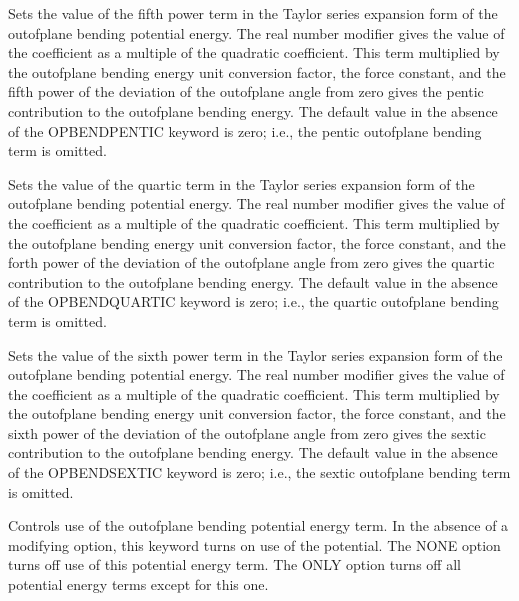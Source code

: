\documentclass[letterpaper,11pt,english]{sphinxmanual}
\begin{document}
  Sets the value of the fifth power term in the Taylor series expansion form of the out\sphinxhyphen{}of\sphinxhyphen{}plane bending potential energy. The real number modifier gives the value of the coefficient as a multiple of the quadratic coefficient. This term multiplied by the out\sphinxhyphen{}of\sphinxhyphen{}plane bending energy unit conversion factor, the force constant, and the fifth power of the deviation of the out\sphinxhyphen{}of\sphinxhyphen{}plane angle from zero gives the pentic contribution to the out\sphinxhyphen{}of\sphinxhyphen{}plane bending energy. The default value in the absence of the OPBEND\sphinxhyphen{}PENTIC keyword is zero; i.e., the pentic out\sphinxhyphen{}of\sphinxhyphen{}plane bending term is omitted.

  Sets the value of the quartic term in the Taylor series expansion form of the out\sphinxhyphen{}of\sphinxhyphen{}plane bending potential energy. The real number modifier gives the value of the coefficient as a multiple of the quadratic coefficient. This term multiplied by the out\sphinxhyphen{}of\sphinxhyphen{}plane bending energy unit conversion factor, the force constant, and the forth power of the deviation of the out\sphinxhyphen{}of\sphinxhyphen{}plane angle from zero gives the quartic contribution to the out\sphinxhyphen{}of\sphinxhyphen{}plane bending energy. The default value in the absence of the OPBEND\sphinxhyphen{}QUARTIC keyword is zero; i.e., the quartic out\sphinxhyphen{}of\sphinxhyphen{}plane bending term is omitted.

  Sets the value of the sixth power term in the Taylor series expansion form of the out\sphinxhyphen{}of\sphinxhyphen{}plane bending potential energy. The real number modifier gives the value of the coefficient as a multiple of the quadratic coefficient. This term multiplied by the out\sphinxhyphen{}of\sphinxhyphen{}plane bending energy unit conversion factor, the force constant, and the sixth power of the deviation of the out\sphinxhyphen{}of\sphinxhyphen{}plane angle from zero gives the sextic contribution to the out\sphinxhyphen{}of\sphinxhyphen{}plane bending energy. The default value in the absence of the OPBEND\sphinxhyphen{}SEXTIC keyword is zero; i.e., the sextic out\sphinxhyphen{}of\sphinxhyphen{}plane bending term is omitted.

  Controls use of the out\sphinxhyphen{}of\sphinxhyphen{}plane bending potential energy term. In the absence of a modifying option, this keyword turns on use of the potential. The NONE option turns off use of this potential energy term. The ONLY option turns off all potential energy terms except for this one.
\end{document}
